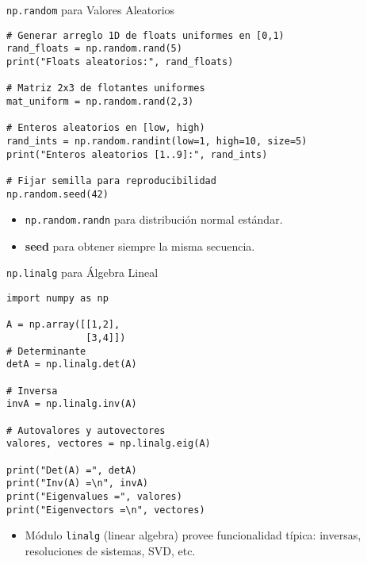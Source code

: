 \documentclass[10pt]{beamer}
\begin{document}
\begin{frame}[fragile]{\texttt{np.random} para Valores Aleatorios}
\begin{verbatim}
# Generar arreglo 1D de floats uniformes en [0,1)
rand_floats = np.random.rand(5)
print("Floats aleatorios:", rand_floats)

# Matriz 2x3 de flotantes uniformes
mat_uniform = np.random.rand(2,3)

# Enteros aleatorios en [low, high)
rand_ints = np.random.randint(low=1, high=10, size=5)
print("Enteros aleatorios [1..9]:", rand_ints)

# Fijar semilla para reproducibilidad
np.random.seed(42)
\end{verbatim}
\begin{itemize}
  \item \texttt{np.random.randn} para distribución normal estándar.
  \item \textbf{seed} para obtener siempre la misma secuencia.
\end{itemize}
\end{frame}

\begin{frame}[fragile]{\texttt{np.linalg} para Álgebra Lineal}
\begin{verbatim}
import numpy as np

A = np.array([[1,2],
              [3,4]])
# Determinante
detA = np.linalg.det(A)

# Inversa
invA = np.linalg.inv(A)

# Autovalores y autovectores
valores, vectores = np.linalg.eig(A)

print("Det(A) =", detA)
print("Inv(A) =\n", invA)
print("Eigenvalues =", valores)
print("Eigenvectors =\n", vectores)
\end{verbatim}
\begin{itemize}
  \item Módulo \texttt{linalg} (linear algebra) provee funcionalidad típica: inversas, resoluciones de sistemas, SVD, etc.
\end{itemize}
\end{frame}

\end{document}
